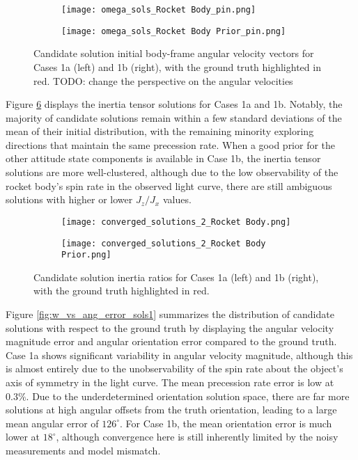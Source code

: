 \documentclass[a4paper,twocolumn]{spaceDebrisC} %
\begin{document}
\begin{figure}[H]
  \centering
  \begin{subfigure}[t]{0.23\textwidth}
    \centering
    \texttt{[image: omega\_sols\_Rocket Body\_pin.png]}
    \caption{}
    \label{fig:omega_sols1a}
  \end{subfigure}
  \hfill
  \begin{subfigure}[t]{0.23\textwidth}
    \centering
    \texttt{[image: omega\_sols\_Rocket Body Prior\_pin.png]}
    \caption{}
    \label{fig:omega_sols1b}
  \end{subfigure}
  \caption{Candidate solution initial body-frame angular velocity vectors for Cases 1a (left) and 1b (right), with the ground truth highlighted in red. TODO: change the perspective on the angular velocities}
  \label{fig:omega_sols1}
\end{figure}

Figure \ref{fig:i_sols1} displays the inertia tensor solutions for Cases 1a and 1b. Notably, the majority of candidate solutions remain within a few standard deviations of the mean of their initial distribution, with the remaining minority exploring directions that maintain the same precession rate. When a good prior for the other attitude state components is available in Case 1b, the inertia tensor solutions are more well-clustered, although due to the low observability of the rocket body's spin rate in the observed light curve, there are still ambiguous solutions with higher or lower $J_z / J_x$ values.

\begin{figure}[H]
  \centering
  \begin{subfigure}[t]{0.23\textwidth}
    \centering
    \texttt{[image: converged\_solutions\_2\_Rocket Body.png]}
    \caption{}
    \label{fig:i_sols1a}
  \end{subfigure}
  \hfill
  \begin{subfigure}[t]{0.23\textwidth}
    \centering
    \texttt{[image: converged\_solutions\_2\_Rocket Body Prior.png]}
    \caption{}
    \label{fig:i_sols1b}
  \end{subfigure}
  \caption{Candidate solution inertia ratios for Cases 1a (left) and 1b (right), with the ground truth highlighted in red.}
  \label{fig:i_sols1}
\end{figure}

Figure \ref{fig:w_vs_ang_error_sols1} summarizes the distribution of candidate solutions with respect to the ground truth by displaying the angular velocity magnitude error and angular orientation error compared to the ground truth. Case 1a shows significant variability in angular velocity magnitude, although this is almost entirely due to the unobservability of the spin rate about the object's axis of symmetry in the light curve. The mean precession rate error is low at $0.3\%$. Due to the underdetermined orientation solution space, there are far more solutions at high angular offsets from the truth orientation, leading to a large mean angular error of $126^\circ$. For Case 1b, the mean orientation error is much lower at $18^\circ$, although convergence here is still inherently limited by the noisy measurements and model mismatch.
\end{document}
